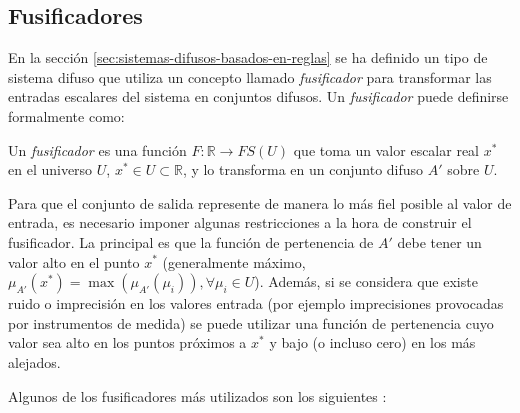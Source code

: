 \subsection{Fusificadores}\label{sec:fusificadores}

En la sección \ref{sec:sistemas-difusos-basados-en-reglas} se ha definido un tipo de sistema difuso que utiliza un concepto llamado \emph{fusificador} para transformar las entradas escalares del sistema en conjuntos difusos. Un \emph{fusificador} puede definirse formalmente como:

\begin{definition}\label{def:fusificador}
Un \emph{fusificador} es una función $F:\mathbb{R} \rightarrow FS(U)$ que toma un valor escalar real $x^{*}$ en el universo $U$, $x^{*}\in U \subset \mathbb{R}$, y lo transforma en un conjunto difuso $A'$ sobre $U$.
\end{definition}

Para que el conjunto de salida represente de manera lo más fiel posible al valor de entrada, es necesario imponer algunas restricciones a la hora de construir el fusificador. La principal es que la función de pertenencia de $A'$ debe tener un valor alto en el punto $x^*$ (generalmente máximo, $\mu_{A'}(x^*) = \max(\mu_{A'}(\mu_{i})),\forall \mu_{i} \in U$). Además, si se considera que existe ruido o imprecisión en los valores entrada (por ejemplo imprecisiones provocadas por instrumentos de medida) se puede utilizar una función de pertenencia cuyo valor sea alto en los puntos próximos a $x^*$ y bajo (o incluso cero) en los más alejados.

Algunos de los fusificadores más utilizados son los siguientes \cite{wang1997}:


